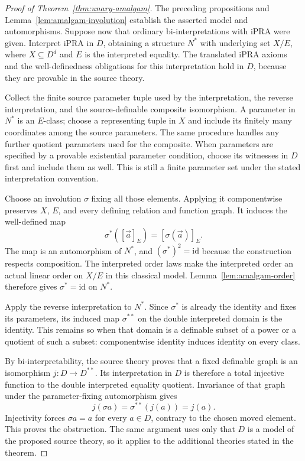 \begin{proof}[Proof of Theorem~\ref{thm:unary-amalgam}]
The preceding propositions and Lemma~\ref{lem:amalgam-involution}
establish the asserted model and automorphisms. Suppose now that
ordinary bi-interpretations with iPRA were given. Interpret iPRA in
$D$, obtaining a structure $N^*$ with underlying set
$X/E$, where $X\subseteq D^d$ and $E$ is the interpreted equality.
The translated iPRA axioms and the well-definedness obligations for
this interpretation hold in $D$, because they are provable in the
source theory.

Collect the finite source parameter tuple used by the interpretation,
the reverse interpretation, and the source-definable composite
isomorphism. A parameter in $N^*$ is an $E$-class; choose a
representing tuple in $X$ and include its finitely many coordinates
among the source parameters. The same procedure handles any further
quotient parameters used for the composite. When parameters are
specified by a provable existential parameter condition, choose its
witnesses in $D$ first and include them as well. This is still a
finite parameter set under the stated interpretation convention.

Choose an involution $\sigma$ fixing all those elements.
Applying it componentwise preserves $X$, $E$, and every defining
relation and function graph. It induces the well-defined map
\[
           \sigma^*([\vec a]_E)=[\sigma(\vec a)]_E.
 \tag{Ind}\label{eq:amalgam-induced}
\]
The map is an automorphism of $N^*$, and
$(\sigma^*)^2=\mathrm{id}$ because the construction respects
composition. The interpreted order laws make the interpreted order
an actual linear order on $X/E$ in this classical model.
Lemma~\ref{lem:amalgam-order} therefore gives
$\sigma^*=\mathrm{id}$ on $N^*$.

Apply the reverse interpretation to $N^*$. Since $\sigma^*$
is already the identity and fixes its parameters, its induced map
$\sigma^{**}$ on the double interpreted domain is the identity.
This remains so when that domain is a definable subset of a power
or a quotient of such a subset: componentwise identity induces
identity on every class.

By bi-interpretability, the source theory proves that a fixed
definable graph is an isomorphism $j:D\to D^{**}$. Its
interpretation in $D$ is therefore a total injective function to
the double interpreted equality quotient. Invariance of that graph
under the parameter-fixing automorphism gives
\[
                   j(\sigma a)=\sigma^{**}(j(a))=j(a).
 \tag{Nat}\label{eq:amalgam-natural}
\]
Injectivity forces $\sigma a=a$ for every $a\in D$, contrary
to the chosen moved element. This proves the obstruction. The same
argument uses only that $D$ is a model of the proposed source theory,
so it applies to the additional theories stated in the theorem.
\end{proof}

